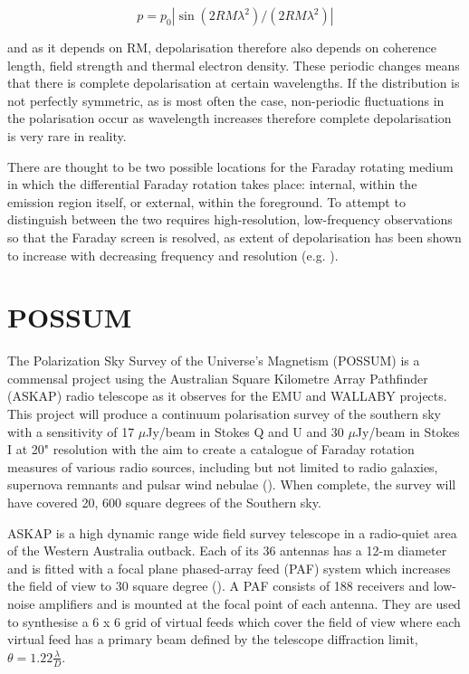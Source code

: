 \begin{equation}
    p = p_0 |\sin(2 RM \lambda^2)/(2RM\lambda^2)|
    \label{eq: Faraday depolarisation}
\end{equation}

and as it depends on RM, depolarisation therefore also depends on coherence length, field strength and thermal electron density. These periodic changes means that there is complete depolarisation at certain wavelengths. If the distribution is not perfectly symmetric, as is most often the case, non-periodic fluctuations in the polarisation occur as wavelength increases therefore complete depolarisation is very rare in reality.

There are thought to be two possible locations for the Faraday rotating medium in which the differential Faraday rotation takes place: internal, within the emission region itself, or external, within the foreground. To attempt to distinguish between the two requires high-resolution, low-frequency observations so that the Faraday screen is resolved, as extent of depolarisation has been shown to increase with decreasing frequency and resolution (e.g. \cite{cygnus_A}).


\section{POSSUM}

The Polarization Sky Survey of the Universe's Magnetism (POSSUM) is a commensal project using the Australian Square Kilometre Array Pathfinder (ASKAP) radio telescope as it observes for the EMU and WALLABY projects. This project will produce a continuum polarisation survey of the southern sky with a sensitivity of 17 $\mu$Jy/beam in Stokes Q and U and 30 $\mu$Jy/beam in Stokes I at 20" resolution with the aim to create a catalogue of Faraday rotation measures of various radio sources, including but not limited to radio galaxies, supernova remnants and pulsar wind nebulae (\cite{POSSUM}). When complete, the survey will have covered 20, 600 square degrees of the Southern sky.

ASKAP is a high dynamic range wide field survey telescope in a radio-quiet area of the Western Australia outback. Each of its 36 antennas has a 12-m diameter and is fitted with a focal plane phased-array feed (PAF) system which increases the field of view to 30 square degree (\cite{ASKAP}). A PAF consists of 188 receivers and low-noise amplifiers and is mounted at the focal point of each antenna. They are used to synthesise a 6 x 6 grid of virtual feeds which cover the field of view where each virtual feed has a primary beam defined by the telescope diffraction limit, $\theta = 1.22\frac{\lambda}{D}$.




